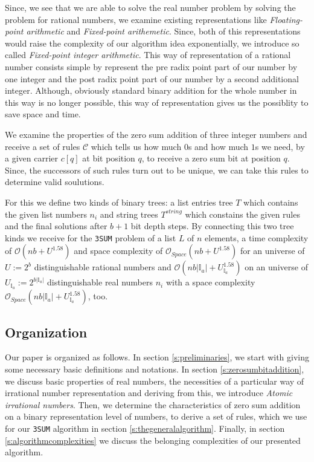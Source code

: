 Since, we see that we are able to solve the real number problem by solving the problem for rational numbers, we examine existing representations like \textit{Floating-point arithmetic} and \textit{Fixed-point arithemetic}. Since, both of this representations would raise the complexity of our algorithm idea exponentially, we introduce so called \textit{Fixed-point integer arithmetic}. This way of representation of a rational number consists simple by represent the pre radix point part of our number by one integer and the post radix point part of our number by a second additional integer. Although, obviously standard binary addition for the whole number in this way is no longer possible, this way of representation gives us the possiblity to save space and time.

We examine the properties of the zero sum addition of three integer numbers and receive a set of rules $\mathcal{C}$ which tells us how much $0$s and how much $1$s we need, by a given carrier $c{[q]}$ at bit position $q$, to receive a zero sum bit at position $q$. Since, the successors of such rules turn out to be unique, we can take this rules to determine valid soulutions.

For this we define two kinds of binary trees: a list entries tree $T$ which contains the given list numbers $n_{i}$ and string trees $T^{string}$ which constains the given rules and the final solutions after $b + 1$ bit depth steps. By connecting this two tree kinds we receive for the \texttt{3SUM} problem of a list $L$ of $n$ elements, a time complexity of $\mathcal{O}\left(nb + U^{1.58}\right)$ and space complexity of $\mathcal{O}_{Space}\left(nb + U^{1.58}\right)$ for an universe of $U := 2^{b}$ distinguishable rational numbers and $\mathcal{O}\left(nb|\mathbb{I}_{a}| + U^{1.58}_{\mathbb{I}_{a}}\right)$ on an universe of $U_{\mathbb{I}_{a}} := 2^{b |\mathbb{I}_{a}|}$ distinguishable real numbers $n_{i}$ with a space complexity $\mathcal{O}_{Space}\left(nb|\mathbb{I}_{a}| + U^{1.58}_{\mathbb{I}_{a}}\right)$, too.
\subsection{Organization}
\label{ss:organization}
Our paper is organized as follows. In section \ref{s:preliminaries}, we start with giving some necessary basic definitions and notations. In section \ref{s:zerosumbitaddition}, we discuss basic properties of real numbers, the necessities of a particular way of irrational number representation and deriving from this, we introduce \textit{Atomic irrational numbers}. Then, we determine the characteristics of zero sum addition on a binary representation level of numbers, to derive a set of rules, which we use for our \texttt{3SUM} algorithm in section \ref{s:thegeneralalgorithm}. Finally, in section \ref{s:algorithmcomplexities} we discuss the belonging complexities of our presented algorithm.
